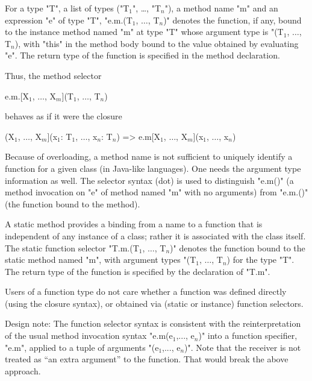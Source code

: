 For a
type \xcd"T", a list of types
(\xcdmath"T$_1$", \dots, \xcdmath"T$_n$"), 
a method name
\xcd"m" and an expression \xcd"e" of type \xcd"T",
\xcdmath"e.m.(T$_1$, $\dots$, T$_n$)" denotes the function,
if any, bound to the instance method named \xcd"m" at type
\xcd"T" whose argument
type is
\xcdmath"(T$_1$, $\dots$, T$_n$), with \xcd"this" in the method
body bound to the value obtained
by evaluating \xcd"e". The
return type of the function is specified in the method declaration.

Thus, the method selector

\begin{xtenmath}
e.m.[X$_1$, $\dots$, X$_m$](T$_1$, $\dots$, T$_n$)
\end{xtenmath}

behaves as if it were the closure

\begin{xtenmath}
(X$_1$, $\dots$, X$_m$](x$_1$: T$_1$, $\dots$, x$_n$: T$_n$) => e.m[X$_1$, $\dots$, X$_m$](x$_1$, $\dots$, x$_n$)
\end{xtenmath}

\begin{note}
Because of overloading, a method name is not sufficient to
uniquely identify a function for a given class (in Java-like languages).
One needs the argument type information as well.
The selector syntax (dot) is used to distinguish \xcd"e.m()" (a
method invocation on \xcd"e" of method named \xcd"m" with no arguments)
from \xcd"e.m.()"
(the function bound to the method). 
\end{note}

A static method provides a binding from a name to a function that is
independent of any instance of a class; rather it is associated with the
class itself. The static function selector
\xcdmath"T.m.(T$_1$, $\dots$, T$_n$)" denotes the
function bound to the static method named \xcd"m", with argument types
\xcdmath"(T$_1$, $\dots$, T$_n$) for the type \xcd"T". The return type
of the function is specified by the declaration of \xcd"T.m".

Users of a function type do not care whether a function was defined
directly (using the closure syntax), or obtained via (static or
instance) function selectors.

\begin{note}
Design note: The function selector syntax is consistent with the
reinterpretation of the usual method invocation syntax
\xcdmath"e.m(e$_1$,..., e$_n$)"
into a function specifier, \xcd"e.m", applied to a tuple of arguments
\xcdmath"(e$_1$,..., e$_n$)". Note that the receiver is not
treated as ``an extra argument'' to the
function. That would break the above approach.
\end{note}


